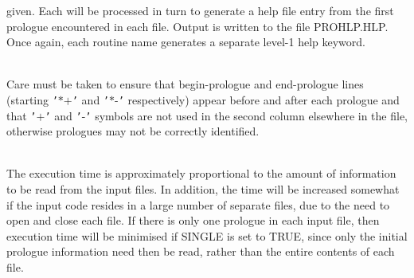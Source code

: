 \documentclass[twoside,11pt]{article}
\renewcommand{\_}{\texttt{\symbol{95}}}
\newcommand{\sstnotes}[1]{\item[Notes:] \mbox{} \\[1.3ex] #1}
\newcommand{\sstdiytopic}[2]{\item[{\hspace{-0.35em}#1\hspace{-0.35em}:}]
\mbox{} \\[1.3ex] #2}
\newcommand{\sstnotes}[1]{\item[Notes:] #1 }
\newcommand{\sstdiytopic}[2]{\item[{#1}] #2 }
\begin{document}
{{{         given. Each will be processed in turn to generate a help file
         entry from the first prologue encountered in each file.
         Output is written to the file PROHLP.HLP. Once again, each
         routine name generates a separate level-1 help keyword.
      }
   }
   \sstnotes{
      Care must be taken to ensure that begin-prologue and end-prologue
      lines (starting {\tt '}$*$$+${\tt '} and {\tt '}$*$-{\tt '} respectively) appear before and
      after each prologue and that {\tt '}$+${\tt '} and {\tt '}-{\tt '} symbols are not used in
      the second column elsewhere in the file, otherwise prologues may
      not be correctly identified.
   }
   \sstdiytopic{
      Timing
   }{
      The execution time is approximately proportional to the amount of
      information to be read from the input files. In addition, the
      time will be increased somewhat if the input code resides in a
      large number of separate files, due to the need to open and close
      each file. If there is only one prologue in each input file, then
      execution time will be minimised if SINGLE is set to TRUE, since
      only the initial prologue information need then be read, rather
      than the entire contents of each file.
   }
}
\newpage
\end{document}
